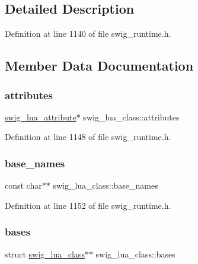 \subsection{Detailed Description}


Definition at line 1140 of file swig\+\_\+runtime.\+h.



\subsection{Member Data Documentation}
\mbox{\label{structswig__lua__class_a3061adc91d7cb1a16967927e8d4a7261}} 
\subsubsection{\texorpdfstring{attributes}{attributes}}
{\footnotesize\ttfamily \mbox{\hyperlink{structswig__lua__attribute}{swig\+\_\+lua\+\_\+attribute}}$\ast$ swig\+\_\+lua\+\_\+class\+::attributes}



Definition at line 1148 of file swig\+\_\+runtime.\+h.

\mbox{\label{structswig__lua__class_a25f24829385c30c59cec92c91fceca23}} 
\subsubsection{\texorpdfstring{base\+\_\+names}{base\_names}}
{\footnotesize\ttfamily const char$\ast$$\ast$ swig\+\_\+lua\+\_\+class\+::base\+\_\+names}



Definition at line 1152 of file swig\+\_\+runtime.\+h.

\mbox{\label{structswig__lua__class_a468e2d019d6cff6bbe8fefc8f572420b}} 
\subsubsection{\texorpdfstring{bases}{bases}}
{\footnotesize\ttfamily struct \mbox{\hyperlink{structswig__lua__class}{swig\+\_\+lua\+\_\+class}}$\ast$$\ast$ swig\+\_\+lua\+\_\+class\+::bases}




